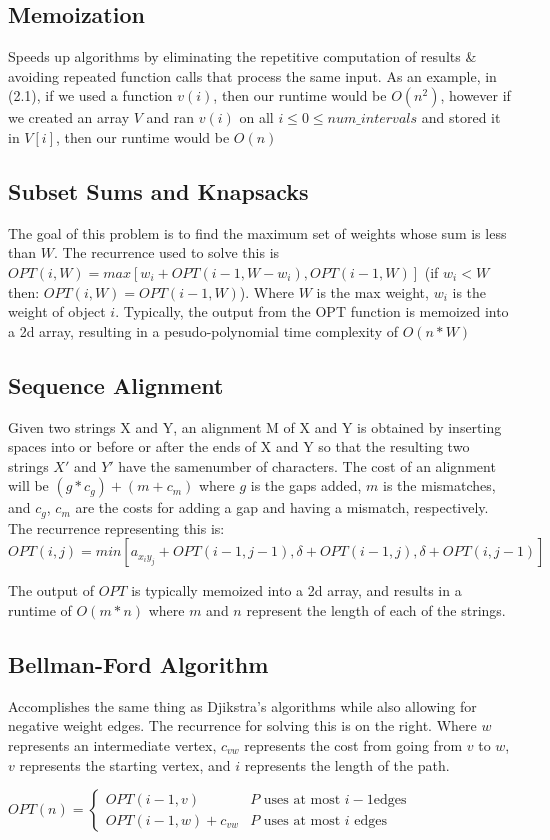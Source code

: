 \documentclass{article}
\begin{document}
\subsection{Memoization}
Speeds up algorithms by eliminating the repetitive computation of results \& avoiding repeated function calls that process the same input.
As an example, in (2.1), if we used a function $v(i)$, then our runtime would be $O(n^2)$, however if we created an array $V$ and ran $v(i)$
on all $i \leq 0 \leq num\_intervals$  and stored it in $V[i]$, then our runtime would be $O(n)$

\subsection{Subset Sums and Knapsacks}
The goal of this problem is to find the maximum set of weights whose sum is less than $W$.
The recurrence used to solve this is $OPT(i, W) = max[w_i + OPT(i - 1, W - w_i), OPT(i-1, W)]$ (if $w_i < W$ then: $OPT(i, W) = OPT(i-1, W)$).
Where $W$ is the max weight, $w_i$ is the weight of object $i$. Typically, the output from the OPT 
function is memoized into a 2d array, resulting in a pesudo-polynomial time complexity of $O(n * W)$

\subsection{Sequence Alignment}
Given two strings X and Y, an alignment M of X and Y is obtained by inserting spaces into or
before or after the ends of X and Y so that the resulting two strings $X'$ and $Y'$  have the samenumber of characters.
The cost of an alignment will be $(g * c_g) + (m + c_m)$ where $g$ is the gaps added, $m$ is the mismatches, and $c_g$, $c_m$
are the costs for adding a gap and having a mismatch, respectively.
The recurrence representing this is: $OPT(i, j) = min[a_{x_iy_j} + OPT(i - 1, j - 1),\delta + OPT(i - 1, j), \delta + OPT(i, j - 1)]$

\noindent The output of $OPT$ is typically memoized into a 2d array, and results in a runtime of $O(m * n)$ where $m$ and $n$ represent
the length of each of the strings.

\subsection{Bellman-Ford Algorithm}
\begin{multicols}{2}
Accomplishes the same thing as Djikstra's algorithms while also allowing for negative
weight edges. The recurrence for solving this is on the right.
Where $w$ represents an intermediate vertex, $c_{vw}$ represents the cost from going from $v$ to $w$,
$v$ represents the starting vertex, and $i$ represents the length of the path. 
\columnbreak

$OPT(n) = \begin{cases}
    OPT(i-1, v)  & P \text{ uses at most } i-1 \text{edges} \\
    OPT(i-1, w) + c_{vw} & P \text{ uses at most } i \text{ edges}
  \end{cases}$
\end{multicols}
\end{document}
